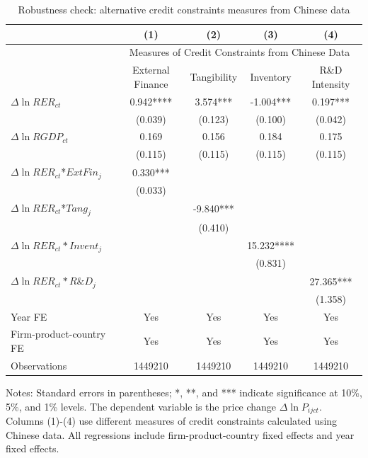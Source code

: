 \documentclass[12pt]{article}
\begin{document}
\begin{table}[htbp]
	\centering
	\caption{Robustness check: alternative credit constraints measures from Chinese data}
	\begin{threeparttable}
	\begin{tabular}{lcccc}
		\toprule
		& (1)   & (2)   & (3)   & (4) \\
		\midrule
		& \multicolumn{4}{c}{Measures of Credit Constraints from Chinese Data} \\
		& External Finance & Tangibility & Inventory & R\&D Intensity \\
		\midrule
		$\Delta \ln RER_{ct}$ & 0.942**** & 3.574*** & -1.004*** & 0.197*** \\
		& (0.039) & (0.123) & (0.100) & (0.042) \\
		$\Delta \ln RGDP_{ct}$ & 0.169 & 0.156 & 0.184 & 0.175 \\
		& (0.115) & (0.115) & (0.115) & (0.115) \\
		$\Delta \ln RER_{ct}$*$ExtFin_{j}$ & 0.330*** &       &       &  \\
		& (0.033) &       &       &  \\
		$\Delta \ln RER_{ct}$*$Tang_{j}$ &       & -9.840*** &       &  \\
		&       & (0.410) &       &  \\
		$\Delta \ln RER_{ct}*Invent_{j}$ &       &       & 15.232**** &  \\
		&       &       & (0.831) &  \\
		$\Delta \ln RER_{ct}*R\&D_{j}$ &       &       &       & 27.365*** \\
		&       &       &       & (1.358) \\
		Year FE  & Yes   & Yes   & Yes   & Yes \\
		Firm-product-country FE & Yes   & Yes   & Yes   & Yes \\
		Observations & 1449210 & 1449210 & 1449210 & 1449210 \\
		\bottomrule
	\end{tabular}
	\begin{tablenotes}
		\footnotesize
		\item[Notes:]  Standard errors in parentheses; *, **, and *** indicate significance at 10\%, 5\%, and 1\% levels. The dependent variable is the price change $\Delta \ln P_{ijct}$. Columns (1)-(4) use different measures of credit constraints calculated using Chinese data. All regressions include firm-product-country fixed effects and year fixed effects.
	\end{tablenotes}
	\end{threeparttable}
        \label{tab.robust.credit}
\end{table}
\end{document}
